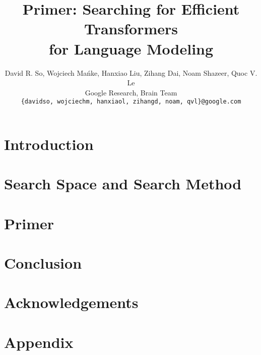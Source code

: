 \documentclass{article}
\title{Primer: Searching for Efficient Transformers\\ for Language Modeling}
\author{David R. So, Wojciech Mańke, Hanxiao Liu, Zihang Dai, Noam Shazeer, Quoc V. Le\\
  Google Research, Brain Team\\
  \texttt{\{davidso, 
wojciechm, 
hanxiaol, 
zihangd, noam, qvl\}@google.com}\\
}
\newcommand{\modelname}{Primer\xspace}
\begin{document}
\maketitle

\begin{abstract}



\end{abstract}

\section{Introduction}



\section{Search Space and Search Method}
\label{sect:methods}



\section{\modelname}
\label{sect:primer_model}



\section{Conclusion}



\section*{Acknowledgements}






\newpage
\appendix

\section{Appendix}


\end{document}
